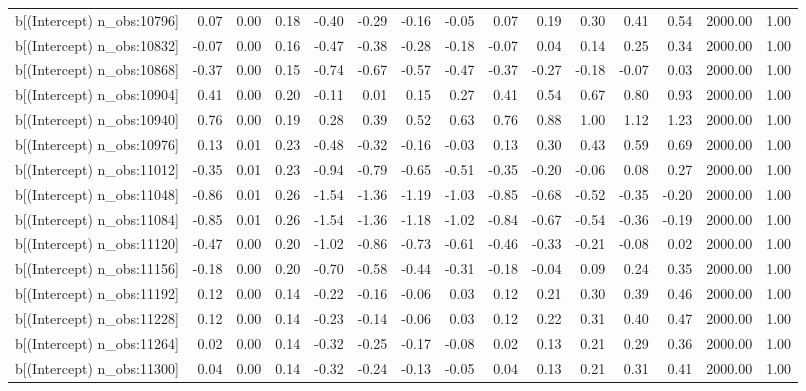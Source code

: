 \begin{table}[ht]
\begin{tabular}{rrrrrrrrrrrrrrr}
  b[(Intercept) n\_obs:10796] & 0.07 & 0.00 & 0.18 & -0.40 & -0.29 & -0.16 & -0.05 & 0.07 & 0.19 & 0.30 & 0.41 & 0.54 & 2000.00 & 1.00 \\ 
  b[(Intercept) n\_obs:10832] & -0.07 & 0.00 & 0.16 & -0.47 & -0.38 & -0.28 & -0.18 & -0.07 & 0.04 & 0.14 & 0.25 & 0.34 & 2000.00 & 1.00 \\ 
  b[(Intercept) n\_obs:10868] & -0.37 & 0.00 & 0.15 & -0.74 & -0.67 & -0.57 & -0.47 & -0.37 & -0.27 & -0.18 & -0.07 & 0.03 & 2000.00 & 1.00 \\ 
  b[(Intercept) n\_obs:10904] & 0.41 & 0.00 & 0.20 & -0.11 & 0.01 & 0.15 & 0.27 & 0.41 & 0.54 & 0.67 & 0.80 & 0.93 & 2000.00 & 1.00 \\ 
  b[(Intercept) n\_obs:10940] & 0.76 & 0.00 & 0.19 & 0.28 & 0.39 & 0.52 & 0.63 & 0.76 & 0.88 & 1.00 & 1.12 & 1.23 & 2000.00 & 1.00 \\ 
  b[(Intercept) n\_obs:10976] & 0.13 & 0.01 & 0.23 & -0.48 & -0.32 & -0.16 & -0.03 & 0.13 & 0.30 & 0.43 & 0.59 & 0.69 & 2000.00 & 1.00 \\ 
  b[(Intercept) n\_obs:11012] & -0.35 & 0.01 & 0.23 & -0.94 & -0.79 & -0.65 & -0.51 & -0.35 & -0.20 & -0.06 & 0.08 & 0.27 & 2000.00 & 1.00 \\ 
  b[(Intercept) n\_obs:11048] & -0.86 & 0.01 & 0.26 & -1.54 & -1.36 & -1.19 & -1.03 & -0.85 & -0.68 & -0.52 & -0.35 & -0.20 & 2000.00 & 1.00 \\ 
  b[(Intercept) n\_obs:11084] & -0.85 & 0.01 & 0.26 & -1.54 & -1.36 & -1.18 & -1.02 & -0.84 & -0.67 & -0.54 & -0.36 & -0.19 & 2000.00 & 1.00 \\ 
  b[(Intercept) n\_obs:11120] & -0.47 & 0.00 & 0.20 & -1.02 & -0.86 & -0.73 & -0.61 & -0.46 & -0.33 & -0.21 & -0.08 & 0.02 & 2000.00 & 1.00 \\ 
  b[(Intercept) n\_obs:11156] & -0.18 & 0.00 & 0.20 & -0.70 & -0.58 & -0.44 & -0.31 & -0.18 & -0.04 & 0.09 & 0.24 & 0.35 & 2000.00 & 1.00 \\ 
  b[(Intercept) n\_obs:11192] & 0.12 & 0.00 & 0.14 & -0.22 & -0.16 & -0.06 & 0.03 & 0.12 & 0.21 & 0.30 & 0.39 & 0.46 & 2000.00 & 1.00 \\ 
  b[(Intercept) n\_obs:11228] & 0.12 & 0.00 & 0.14 & -0.23 & -0.14 & -0.06 & 0.03 & 0.12 & 0.22 & 0.31 & 0.40 & 0.47 & 2000.00 & 1.00 \\ 
  b[(Intercept) n\_obs:11264] & 0.02 & 0.00 & 0.14 & -0.32 & -0.25 & -0.17 & -0.08 & 0.02 & 0.13 & 0.21 & 0.29 & 0.36 & 2000.00 & 1.00 \\ 
  b[(Intercept) n\_obs:11300] & 0.04 & 0.00 & 0.14 & -0.32 & -0.24 & -0.13 & -0.05 & 0.04 & 0.13 & 0.21 & 0.31 & 0.41 & 2000.00 & 1.00 \\ 

\end{tabular}
\end{table}
